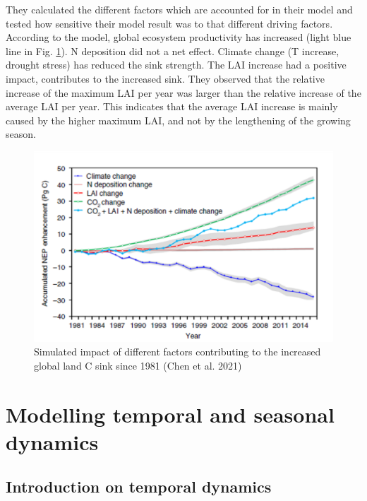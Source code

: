 \documentclass[12pt,oneside]{book}
\begin{document}
They calculated the different factors which are accounted for in their
model and tested how sensitive their model result was to that different
driving factors. According to the model, global ecosystem productivity
has increased (light blue line in Fig. \ref{fig:f335}). N deposition did
not a net effect. Climate change (T increase, drought stress) has
reduced the sink strength. The LAI increase had a positive impact,
contributes to the increased sink. They observed that the relative
increase of the maximum LAI per year was larger than the relative
increase of the average LAI per year. This indicates that the average
LAI increase is mainly caused by the higher maximum LAI, and not by the
lengthening of the growing season.

\begin{figure}

{\centering \includegraphics[width=0.8\linewidth]{figures/chap3/f335_chen2} 

}

\caption{Simulated impact of different factors contributing to the increased global land C sink since 1981 (Chen et al. 2021) }\label{fig:f335}
\end{figure}

\chapter{Modelling temporal and seasonal
dynamics}\label{modelling-temporal-and-seasonal-dynamics}


\section{Introduction on temporal
dynamics}\label{introduction-on-temporal-dynamics}
\end{document}
